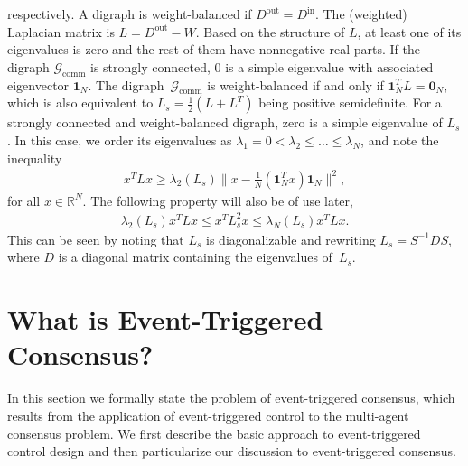 \documentclass{autart}
\newcommand{\real}{{\mathbb{R}}}
\newcommand{\GG}{{\mathcal{G}}}
\newcommand{\Dout}{D^{\operatorname{out}}}
\newcommand{\Din}{D^{\operatorname{in}}}
\newcommand{\ones}[1]{\mathbf{1}_{#1}}
\newcommand{\zeros}[1]{\mathbf{0}_{#1}}
\newcommand{\Sym}[1]{{#1}_{s}}
\newcommand{\commgraph}{\GG_\text{comm}}
\begin{document}
respectively. A digraph is weight-balanced if $\Dout = \Din$.  The
(weighted) Laplacian matrix is $L = \Dout - W$. Based on the structure
of $L$, at least one of its eigenvalues is zero and the rest of them
have nonnegative real parts.  If the digraph $\commgraph$ is strongly
connected, $0$ is a simple eigenvalue with associated eigenvector
$\ones{N}$.  The digraph~$\commgraph$ is weight-balanced if and only
if $\ones{N}^T L = \zeros{N}$, which is also equivalent to
$\Sym{L}=\frac{1}{2}(L + L^T)$ being positive semidefinite. For a
strongly connected and weight-balanced digraph, zero is a simple
eigenvalue of $\Sym{L} $.  In this case, we order its eigenvalues as
$\lambda_1 = 0<\lambda_2\leq \dots \leq \lambda_N$, and note the
inequality
\begin{align}\label{eq:LapBound}
  x^T L x \ge \lambda_2(\Sym{L}) \| x -\frac{1}{N} (\ones{N}^T x)
  \ones{N} \|^2 ,
\end{align}
for all $x \in \real^N$.  The following property will also be of use
later,
\begin{align}\label{eq:lap2-bound}
  \lambda_2(\Sym{L}) x^T L x \leq x^T \Sym{L}^2 x \leq
  \lambda_N(\Sym{L}) x^T L x .
\end{align}
This can be seen by noting that $\Sym{L}$ is diagonalizable and
rewriting $\Sym{L} = S^{-1} D S$, where $D$ is a diagonal matrix
containing the eigenvalues of~$\Sym{L}$.

%

\section{What is Event-Triggered Consensus?}\label{se:background}

In this section we formally state the problem of event-triggered
consensus, which results from the application of event-triggered
control to the multi-agent consensus problem. We first describe the
basic approach to event-triggered control design and then
particularize our discussion to event-triggered consensus. 
\end{document}

